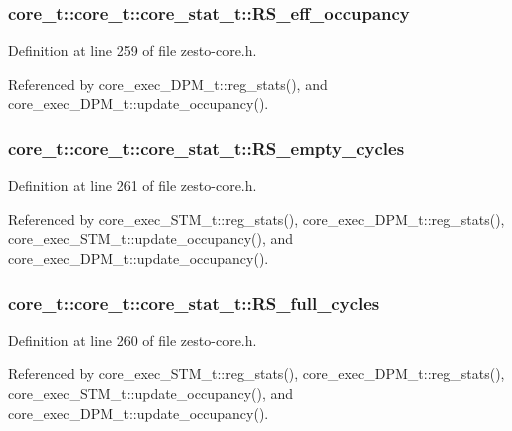 \subsubsection[{RS\_\-eff\_\-occupancy}]{ core\_\-t::core\_\-t::core\_\-stat\_\-t::RS\_\-eff\_\-occupancy}\label{structcore__t_1_1core__stat__t_95b31bd7f27932f8fe38fccbdda7ba38}




Definition at line 259 of file zesto-core.h.

Referenced by core\_\-exec\_\-DPM\_\-t::reg\_\-stats(), and core\_\-exec\_\-DPM\_\-t::update\_\-occupancy().
\subsubsection[{RS\_\-empty\_\-cycles}]{ core\_\-t::core\_\-t::core\_\-stat\_\-t::RS\_\-empty\_\-cycles}\label{structcore__t_1_1core__stat__t_e8a8753db2b224c53929e248798f601b}




Definition at line 261 of file zesto-core.h.

Referenced by core\_\-exec\_\-STM\_\-t::reg\_\-stats(), core\_\-exec\_\-DPM\_\-t::reg\_\-stats(), core\_\-exec\_\-STM\_\-t::update\_\-occupancy(), and core\_\-exec\_\-DPM\_\-t::update\_\-occupancy().
\subsubsection[{RS\_\-full\_\-cycles}]{ core\_\-t::core\_\-t::core\_\-stat\_\-t::RS\_\-full\_\-cycles}\label{structcore__t_1_1core__stat__t_23382493b536f19ec3983eca2a0ba39a}




Definition at line 260 of file zesto-core.h.

Referenced by core\_\-exec\_\-STM\_\-t::reg\_\-stats(), core\_\-exec\_\-DPM\_\-t::reg\_\-stats(), core\_\-exec\_\-STM\_\-t::update\_\-occupancy(), and core\_\-exec\_\-DPM\_\-t::update\_\-occupancy().

